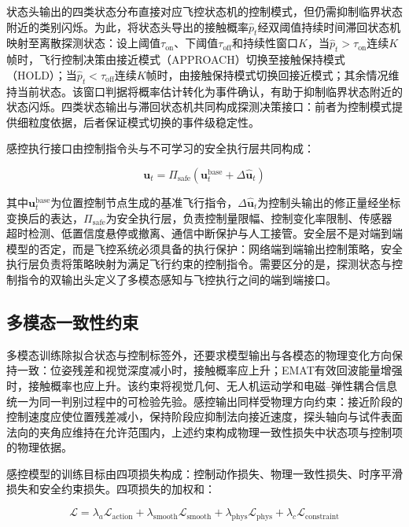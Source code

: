 状态头输出的四类状态分布直接对应飞控状态机的控制模式，但仍需抑制临界状态附近的类别闪烁。为此，将状态头导出的接触概率$\hat{p}_t$经双阈值持续时间滞回状态机映射至离散探测状态：设上阈值$\tau_{\text{on}}$、下阈值$\tau_{\text{off}}$和持续性窗口$K$，当$\hat{p}_t > \tau_{\text{on}}$连续$K$帧时，飞行控制决策由接近模式（APPROACH）切换至接触保持模式（HOLD）；当$\hat{p}_t < \tau_{\text{off}}$连续$K$帧时，由接触保持模式切换回接近模式；其余情况维持当前状态。该窗口判据将概率估计转化为事件确认，有助于抑制临界状态附近的状态闪烁。四类状态输出与滞回状态机共同构成探测决策接口：前者为控制模式提供细粒度依据，后者保证模式切换的事件级稳定性。

感控执行接口由控制指令头与不可学习的安全执行层共同构成：

\begin{equation}
\mathbf{u}_t = \Pi_{\mathrm{safe}}\left(\mathbf{u}^{\mathrm{base}}_t + \Delta\hat{\mathbf{u}}_t\right)
\label{eq:safe_execution}
\end{equation}

其中$\mathbf{u}^{\mathrm{base}}_t$为位置控制节点生成的基准飞行指令，$\Delta\hat{\mathbf{u}}_t$为控制头输出的修正量经坐标变换后的表达，$\Pi_{\mathrm{safe}}$为安全执行层，负责控制量限幅、控制变化率限制、传感器超时检测、低置信度悬停或撤离、通信中断保护与人工接管。安全层不是对端到端模型的否定，而是飞控系统必须具备的执行保护：网络端到端输出控制策略，安全执行层负责将策略映射为满足飞行约束的控制指令。需要区分的是，探测状态与控制指令的双输出头定义了多模态感知与飞控执行之间的端到端接口。

\subsection{多模态一致性约束}

多模态训练除拟合状态与控制标签外，还要求模型输出与各模态的物理变化方向保持一致：位姿残差和视觉深度减小时，接触概率应上升；EMAT有效回波能量增强时，接触概率也应上升。该约束将视觉几何、无人机运动学和电磁--弹性耦合信息统一为同一判别过程中的可检验先验。感控输出同样受物理方向约束：接近阶段的控制速度应使位置残差减小，保持阶段应抑制法向接近速度，探头轴向与试件表面法向的夹角应维持在允许范围内，上述约束构成物理一致性损失中状态项与控制项的物理依据。

感控模型的训练目标由四项损失构成：控制动作损失、物理一致性损失、时序平滑损失和安全约束损失。四项损失的加权和：

\begin{equation}
\mathcal{L} = \lambda_a \mathcal{L}_{\text{action}} + \lambda_{\text{smooth}} \mathcal{L}_{\text{smooth}} + \lambda_{\text{phys}} \mathcal{L}_{\text{phys}} + \lambda_c \mathcal{L}_{\text{constraint}}
\label{eq:total_loss}
\end{equation}

